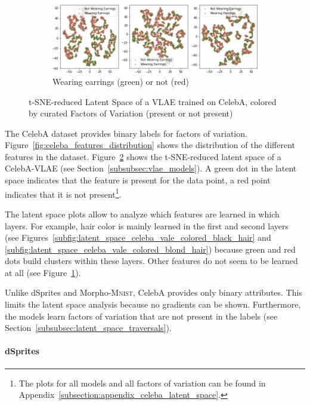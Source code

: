 \begin{figure}
\begin{subfigure}{.49\textwidth}
        \includegraphics[width=\textwidth]{images/latent_spaces/celeba/vlae/vlae_celeba_Wearing_Earrings.png}
        \caption{Wearing earrings (green) or not (red)}
        \label{subfig:latent_space_celeba_vale_colored_wearing_earrings}
    \end{subfigure}
    \caption[VLAE Latent Space for CelebA, Curated Features]{\ac{t-SNE}-reduced Latent Space of a \ac{VLAE} trained on CelebA, colored by curated Factors of Variation (present or not present)}
    \label{fig:latent_space_celeba_vale_colored}
\end{figure}

The CelebA dataset provides binary labels for factors of variation.
Figure~\ref{fig:celeba_features_distribution} shows the distribution of the different features in the dataset.
Figure~\ref{fig:latent_space_celeba_vale_colored} shows the \ac{t-SNE}-reduced latent space of a CelebA-\ac{VLAE} (see Section~\ref{subsubsec:vlae_models}).
A green dot in the latent space indicates that the feature is present for the data point, a red point indicates that it is not present\footnote{The plots for all models and all factors of variation can be found in Appendix~\ref{subsection:appendix_celeba_latent_space}.}.

The latent space plots allow to analyze which features are learned in which layers.
For example, hair color is mainly learned in the first and second layers (see Figures~\ref{subfig:latent_space_celeba_vale_colored_black_hair} and \ref{subfig:latent_space_celeba_vale_colored_blond_hair}) because green and red dots build clusters within these layers.
Other features do not seem to be learned at all (see Figure~\ref{subfig:latent_space_celeba_vale_colored_wearing_earrings}).

Unlike dSprites and Morpho-\textsc{Mnist}, CelebA provides only binary attributes.
This limits the latent space analysis because no gradients can be shown.
Furthermore, the models learn factors of variation that are not present in the labels (see Section~\ref{subsubsec:latent_space_traversals}).

\paragraph{dSprites}

